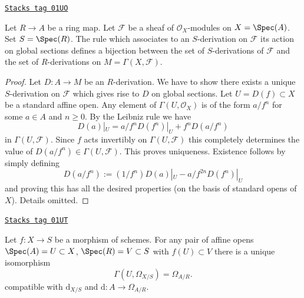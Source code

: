 \begin{lemma}
\label{morphisms-lemma-affine-case-derivation}
\href{https://stacks.math.columbia.edu/tag/01UO}{\texttt{Stacks tag 01UO}}

Let $R \to A$ be a ring map. Let $\mathcal{F}$
be a sheaf of $\mathcal{O}_X$-modules
on $X = \Spec(A)$. Set $S = \Spec(R)$.
The rule which associates to an $S$-derivation on $\mathcal{F}$
its action on global sections defines a bijection between
the set of $S$-derivations of $\mathcal{F}$ and the set of
$R$-derivations on $M = \Gamma(X, \mathcal{F})$.
\end{lemma}

\begin{proof}
Let $D : A \to M$ be an $R$-derivation. We have to show there exists
a unique $S$-derivation on $\mathcal{F}$ which gives rise to
$D$ on global sections. Let $U = D(f) \subset X$ be a standard affine open.
Any element of $\Gamma(U, \mathcal{O}_X)$ is of the form
$a/f^n$ for some $a \in A$ and $n \geq 0$. By the Leibniz rule
we have
$$
D(a)|_U = a/f^n D(f^n)|_U + f^n D(a/f^n)
$$
in $\Gamma(U, \mathcal{F})$. Since $f$ acts invertibly
on $\Gamma(U, \mathcal{F})$ this completely determines
the value of $D(a/f^n) \in \Gamma(U, \mathcal{F})$.
This proves uniqueness. Existence follows by simply defining
$$
D(a/f^n) := (1/f^n) D(a)|_U - a/f^{2n} D(f^n)|_U
$$
and proving this has all the desired properties (on the basis
of standard opens of $X$). Details omitted.
\end{proof}

\begin{lemma}
\label{morphisms-lemma-differentials-affine}
\href{https://stacks.math.columbia.edu/tag/01UT}{\texttt{Stacks tag 01UT}}

Let $f : X \to S$ be a morphism of schemes. For any pair of affine opens
$\Spec(A) = U \subset X$, $\Spec(R) = V \subset S$ with $f(U) \subset V$
there is a unique isomorphism
$$
\Gamma(U, \Omega_{X/S}) = \Omega_{A/R}.
$$
compatible with $\text{d}_{X/S}$ and $\text{d} : A \to \Omega_{A/R}$.
\end{lemma}

